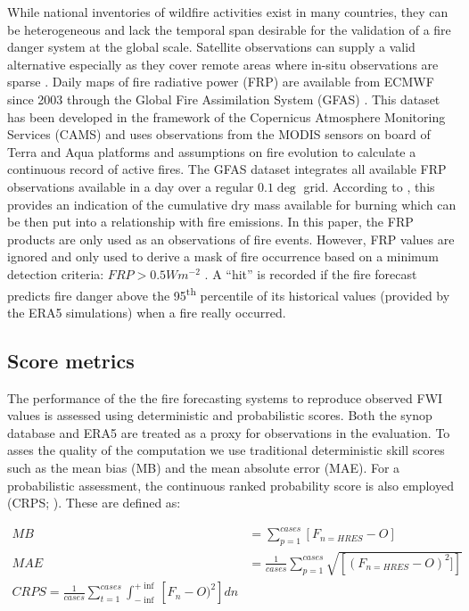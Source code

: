 \documentclass[, manuscript]{copernicus}
\begin{document}
While national inventories of wildfire activities exist in many
countries, they can be heterogeneous and lack the temporal span
desirable for the validation of a fire danger system at the global
scale. Satellite observations can supply a valid alternative especially
as they cover remote areas where in-situ observations are sparse
\citep{flannigan:86,giglio:03,schroeder:08}. Daily maps of fire
radiative power (FRP) \citep{kaufman:03,wooster:05} are available from
ECMWF since 2003 through the Global Fire Assimilation System (GFAS)
\citep{kaiser:2012,digiuseppe:17,digiuseppe:18}. This dataset has been
developed in the framework of the Copernicus Atmosphere Monitoring
Services (CAMS) and uses observations from the MODIS sensors on board of
Terra and Aqua platforms and assumptions on fire evolution to calculate
a continuous record of active fires. The GFAS dataset integrates all
available FRP observations available in a day over a regular \(0.1\deg\)
grid. According to \citet{wooster:05}, this provides an indication of
the cumulative dry mass available for burning which can be then put into
a relationship with fire emissions. In this paper, the FRP products are
only used as an observations of fire events. However, FRP values are
ignored and only used to derive a mask of fire occurrence based on a
minimum detection criteria: \(FRP> 0.5 Wm^{-2}\) \citep{kaiser:2012}. A
``hit'' is recorded if the fire forecast predicts fire danger above the
95\textsuperscript{th} percentile of its historical values (provided by
the ERA5 simulations) when a fire really occurred.

\subsection{Score metrics}

The performance of the the fire forecasting systems to reproduce
observed FWI values is assessed using deterministic and probabilistic
scores. Both the synop database and ERA5 are treated as a proxy for
observations in the evaluation. To asses the quality of the computation
we use traditional deterministic skill scores such as the mean bias (MB)
and the mean absolute error (MAE). For a probabilistic assessment, the
continuous ranked probability score is also employed (CRPS;
\cite{hersbach2000}). These are defined as:

\begin{align}
MB&=\sum_{p=1}^{cases}\left[F_{n=HRES}-O\right]\\
MAE&=\frac{1}{cases}\sum_{p=1}^{cases}\sqrt{\left[(F_{n=HRES}-O)^2]\right]}\\
CRPS=\frac{1}{cases}\sum_{t=1}^{cases}\int_{-\inf}^{+\inf}\left[F_{n}-O)^2\right]dn
\end{align}
\end{document}
